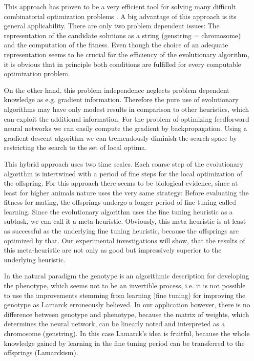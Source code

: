 This approach has proven to be a very efficient tool for solving many
difficult combinatorial optimization problems \cite{goldberg89,reeves93,schwefel95}.
A big advantage of this approach is
its general applicability. There are only two problem dependent
issues: The representation of the candidate solutions as a string
(genstring = chromosome) and the computation of the fitness.  Even
though the choice of an adequate representation seems to be crucial
for the efficiency of the evolutionary algorithm, it is obvious that
in principle both conditions are fulfilled for every computable
optimization problem.

On the other hand, this problem independence neglects problem
dependent knowledge as e.g. gradient information. Therefore the pure
use of evolutionary algorithms may have only modest results in
comparison to other heuristics, which can exploit the additional
information. For the problem of optimizing feedforward neural networks
we can easily compute the gradient by backpropagation. Using a
gradient descent algorithm we can tremendously diminish the search
space by restricting the search to the set of local optima.

This hybrid approach uses two time scales. Each coarse step of the
evolutionary algorithm is intertwined with a period of fine steps for
the local optimization of the offspring. For this approach there seems
to be biological evidence, since at least for higher animals nature
uses the very same strategy: Before evaluating the fitness for mating,
the offsprings undergo a longer period of fine tuning called learning.
Since the evolutionary algorithm uses the fine tuning heuristic as a
subtask, we can call it a meta-heuristic. Obviously, this
meta-heuristic is at least as successful as the underlying fine tuning
heuristic, because the offsprings are optimized by that. Our
experimental investigations will show, that the results of this
meta-heuristic are not only as good but impressively superior to the
underlying heuristic. 

In the natural paradigm the genotype is an algorithmic description for
developing the phenotype, which seems not to be an invertible process,
i.e. it is not possible to use the improvements stemming from learning
(fine tuning) for improving the genotype as Lamarck erroneously
believed. In our application however, there is no difference between
genotype and phenotype, because the matrix of weights, which determines the
neural network, can be linearly noted and interpreted as a chromosome
(genstring). In this case Lamarck's idea is fruitful, because the whole
knowledge gained by learning in the fine tuning period can be
transferred to the offsprings (Lamarckism). 

